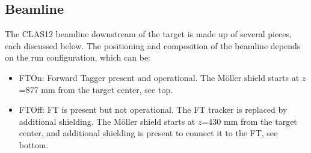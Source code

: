 \subsection{Beamline}

The CLAS12 beamline downstream of the target is made up of several pieces, each discussed below. The positioning and composition of the beamline
depends on the run configuration, which can be:

\begin{itemize}
	\item FTOn: Forward Tagger present and operational. The M\"oller shield starts at $z$=877 mm from the target center, see  top.
	\item FTOff: FT is present but not operational. The FT tracker is replaced by additional shielding.
                 The M\"oller shield starts at $z$=430 mm from the target center, and additional shielding
                 is present to connect it to the FT, see  bottom.
\end{itemize}


